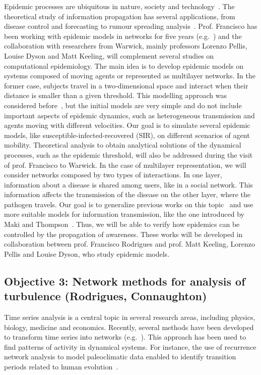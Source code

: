 Epidemic processes are ubiquitous in nature, society and 
technology~\cite{Pastor015}. The theoretical study of information propagation 
has several applications, from disease control and forecasting to rumour 
spreading analysis~\cite{Barrat08, Pastor015}. Prof. Francisco has been working 
with epidemic models in networks for five years (e.g.~\cite{Arruda014, 
Arruda017}) and the collaboration with researchers from Warwick, mainly 
professors Lorenzo Pellis, Louise Dyson and Matt Keeling, will complement 
several studies on computational epidemiology. The main idea is to develop 
epidemic models on systems composed of moving agents or represented as 
multilayer networks. In the former case, subjects travel in a two-dimensional 
space and interact when their distance is smaller than a given threshold. This 
modelling approach was considered before~\cite{Frasca06, Buscarino08}, but the 
initial models are very simple and do not include important aspects of epidemic 
dynamics, such as heterogeneous transmission and agents moving with different 
velocities. Our goal is to simulate several epidemic models, like 
susceptible-infected-recovered (SIR), on different scenarios of agent mobility. 
Theoretical analysis to obtain analytical solutions of the dynamical processes, 
such as the epidemic threshold, will also be addressed during the visit of 
prof. Francisco to Warwick. In the case of multilayer representation, we will 
consider networks composed by two types of interactions. In one layer, 
information about a disease is shared among users, like in a social network. 
This information affects the transmission of the disease on the other layer, 
where the pathogen travels. Our goal is to generalize previous works on this 
topic~\cite{Funk09, Granell013} and use more suitable models for information 
transmission, like the one introduced by Maki and Thompson~\cite{Moreno04}. 
Thus, we will be able to verify how epidemics can be controlled by the 
propagation of awareness. 
These works will be developed in collaboration between prof. Francisco 
Rodrigues and prof. Matt Keeling, Lorenzo Pellis and Louise Dyson, who study 
epidemic models. 


\subsection{Objective 3: Network methods for analysis of turbulence (Rodrigues, 
Connaughton)}
Time series analysis is a central topic in several research areas, including 
physics, biology, medicine and economics. Recently, several methods have been 
developed to transform time series into networks (e.g.~\cite{Lacasa08, 
Marwan09, Donner010}). This approach has been used to find patterns of activity 
in dynamical systems. For instance, the use of recurrence network analysis to 
model paleoclimatic data enabled to identify transition periods related to 
human evolution~\cite{Donges011}. 

